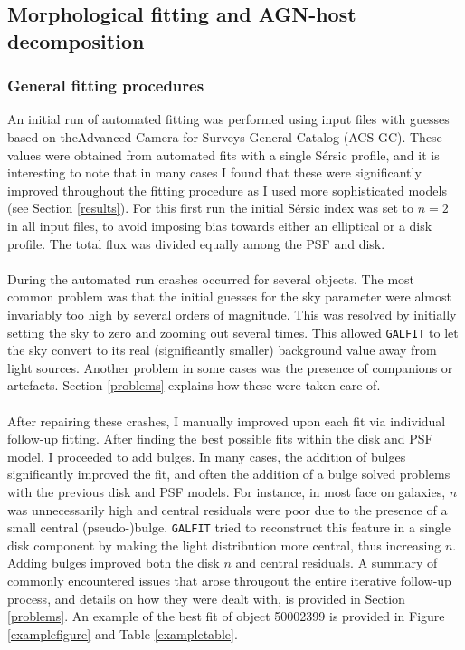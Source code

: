 \documentclass[11pt,twocolumn]{article}
\begin{document}



\subsection{Morphological fitting and AGN-host decomposition}
\subsubsection{General fitting procedures}\label{autofitting}
An initial run of automated fitting was performed using input files with guesses based on theAdvanced Camera for Surveys General Catalog (ACS-GC)\cite{2012ApJS..200....9G}. These values were obtained from automated fits with a single S\'{e}rsic profile, and it is interesting to note that in many cases I found that these were significantly improved throughout the fitting procedure as I used more sophisticated models (see Section \ref{results}). For this first run the initial S\'{e}rsic index was set to $n=2$ in all input files, to avoid imposing bias towards either an elliptical or a disk profile. The total flux was divided equally among the PSF and disk. 
\paragraph{} During the automated run crashes occurred for several objects. The most common problem was that the initial guesses for the sky parameter were almost invariably too high by several orders of magnitude. This was resolved by initially setting the sky to zero and zooming out several times. This allowed {\tt GALFIT} to let the sky convert to its real (significantly smaller) background value away from light sources. Another problem in some cases was the presence of companions or artefacts. Section \ref{problems} explains how these were taken care of. 
\paragraph{} After repairing these crashes, I manually improved upon each fit via individual follow-up fitting. After finding the best possible fits within the disk and PSF model, I proceeded to add bulges. In many cases, the addition of bulges significantly improved the fit, and often the addition of a bulge solved problems with the previous disk and PSF models. For instance, in most face on galaxies, $n$ was unnecessarily high and central residuals were poor due to the presence of a small central (pseudo-)bulge. {\tt GALFIT} tried to reconstruct this feature in a single disk component by making the light distribution more central, thus increasing $n$. Adding bulges improved both the disk $n$ and central residuals. A summary of commonly encountered issues that arose througout the entire iterative follow-up process, and details on how they were dealt with, is provided in Section \ref{problems}. An example of the best fit of object 50002399 is provided in Figure \ref{examplefigure} and Table \ref{exampletable}. 
\end{document}
